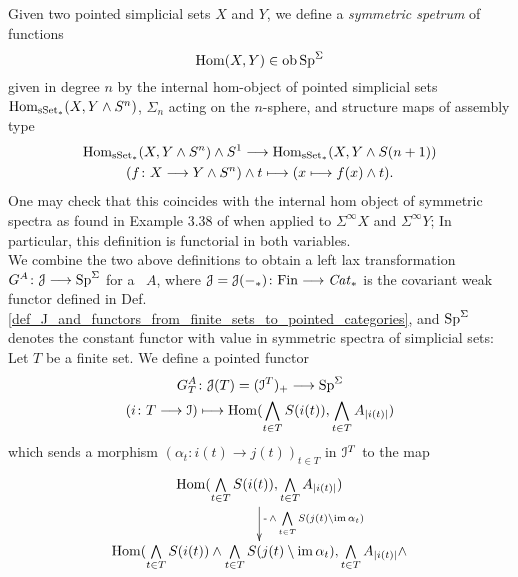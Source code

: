     \begin{defn}\label{def_left_lax_transform_G^A}
      Given two pointed simplicial sets $X$ and $Y$, we define a \emph{symmetric spetrum} of functions 
      \begin{displaymath}
      \operatorname{Hom}(X,Y) \in \operatorname{ob} \mathrm{Sp}^\Sigma
      \end{displaymath}
      given in degree $n$ by the internal hom-object of pointed simplicial sets $\operatorname{Hom}_{\mathrm{sSet}_*}(X,Y \wedge S^n)$, $\Sigma_n$ acting on the $n$-sphere, and structure maps of assembly type
      \begin{gather*}
      \operatorname{Hom}_{\mathrm{sSet}_*}(X,Y \wedge S^n) \wedge S^1 \longrightarrow \operatorname{Hom}_{\mathrm{sSet}_*}(X,Y \wedge S(n+1))\\
      (f \colon X \longrightarrow Y \wedge S^n) \wedge t \longmapsto (x \longmapsto f(x) \wedge t).
      \end{gather*}
      One may check that this coincides with the internal hom object of symmetric spectra as found in Example 3.38 of \cite{schwede2012symmetric} when applied to $\Sigma^\infty X$ and $\Sigma^\infty Y$; In particular, this definition is functorial in both variables.\\
      We combine the two above definitions to obtain a left lax transformation $G^A \colon \mathcal{J} \longrightarrow \mathrm{Sp}^\Sigma$ for a \hring~$A$, where $\mathcal{J} = \mathcal{J}(-_*) \colon \mathrm{Fin} \longrightarrow \mathit{Cat}_*$ is the covariant weak functor defined in Def. \ref{def_J_and_functors_from_finite_sets_to_pointed_categories}, and $\mathrm{Sp}^\Sigma$ denotes the constant functor with value in symmetric spectra of simplicial sets:\\
      Let $T$ be a finite set. We define a pointed functor
      \begin{gather*}
        G^A_T \colon \cJ(T) = (\cI^T)_+ \to \SpS \\
        (i \colon T \to \cI) \mapsto %
          \Hom(\bigwedge_{t \in T} S(i(t)), \bigwedge_{t \in T} A_{\abs{i(t)}} )
      \end{gather*}
      which sends a morphism $(\alpha_t \colon i(t) \to j(t))_{t \in T}$ in $\mathcal{I}^T$ to the map
      \begin{displaymath}
        \xymatrix{
          \Hom(\bigwedge\limits_{t \in T} S(i(t)), \bigwedge\limits_{t \in T} A_{\abs{i(t)}})
            \ar[d]^-{ \operatorname{-} \wedge \bigwedge\limits_{t \in T} S(j(t) \setminus \im \alpha_t) } \\
          \Hom(\bigwedge\limits_{t \in T} S(i(t)) \wedge %
            \bigwedge\limits_{t \in T} S(j(t) \setminus \im \alpha_t), %
            \bigwedge\limits_{t \in T} A_{\abs{i(t)}} \wedge %
}
\end{displaymath}
\end{defn}
